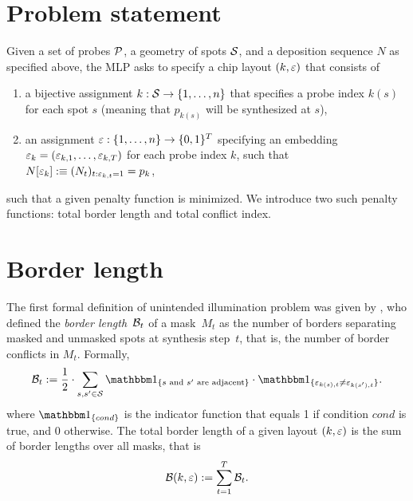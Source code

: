 \section{Problem statement}
\label{sec:mlp_problem}

Given a set of probes ${\mathcal{P}}$, a geometry of spots ${\mathcal{S}}$, and a deposition
sequence $N$ as specified above, the MLP asks to specify a chip layout
$(k,\varepsilon)$ that consists of
\begin{enumerate}
\item a bijective assignment $k: {\mathcal{S}}\to \{1,\dots,n\}$ that specifies a probe
  index $k(s)$ for each spot $s$ (meaning that $p_{k(s)}$ will be synthesized at
  $s$),
\item an assignment $\varepsilon: \{1,\dots,n\}\to \{0,1\}^T$ specifying an embedding
  $\varepsilon_k = (\varepsilon_{k,1},\dots,\varepsilon_{k,T})$ for each probe index $k$, such that
  $N[\varepsilon_k] :\equiv (N_t)_{t: \varepsilon_{k,t}=1} = p_k$,
\end{enumerate}
such that a given penalty function is minimized.  We introduce two such penalty
functions: total border length and total conflict index.


\section{Border length}
\label{sec:mlp_border_length}

The first formal definition of unintended illumination problem was given by
\citet{Hannenhalli2002}, who defined the \emph{border length}~${\mathcal{B}}_t$ of a
mask~$M_{t}$ as the number of borders separating masked and unmasked spots at
synthesis step~$t$, that is, the number of border conflicts in $M_{t}$.
Formally,
\begin{equation}
\label{eq:border_length}
  \CalB_t := \frac{1}{2} \cdot \sum_{s,s' \in \CalS}
    \Ind{s \text{ and } s' \text{ are adjacent}}
    \cdot \Ind{\eps_{k(s),t} \neq \eps_{k(s'),t}}.
\end{equation}
where $\Ind{cond}$ is the indicator function that equals 1 if condition $cond$
is true, and 0 otherwise. The total border length of a given layout $(k,\varepsilon)$
is the sum of border lengths over all masks, that is
\begin{equation}
\label{eq:total_border_length}
  {\mathcal{B}}(k,\varepsilon) := \sum_{t=1}^{T} {\mathcal{B}}_t.
\end{equation}

